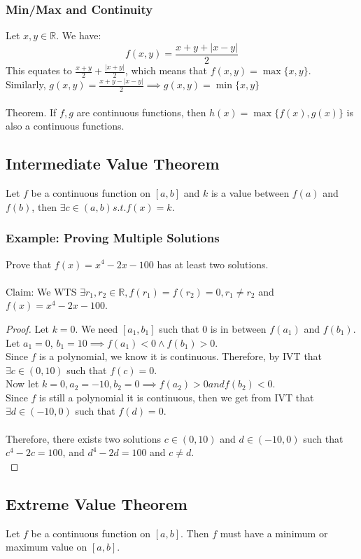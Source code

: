 \documentclass{article}
\begin{document}
\subsubsection{Min/Max and Continuity}
Let $x, y \in\mathbb{R}.$ We have:
$$f(x, y) = \frac{x+y + |x-y|}{2}$$
This equates to $\frac{x+y}{2} + \frac{|x+y|}{2}$, which means that $f(x,y) = \max\{x, y\}$.\\
Similarly, $g(x,y) = \frac{x + y - |x - y|}{2} \implies g(x,y) = \min\{x, y\}$\\
\\
Theorem. If $f,g$ are continuous functions, then $h(x) = \max\{f(x), g(x)\}$ is also a continuous functions.
\subsection{Intermediate Value Theorem}
Let $f$ be a continuous function on $[a, b]$ and $k$ is a value between $f(a)$ and $f(b)$, then $\exists c \in (a,b) s.t. f(x) = k$.
\subsubsection{Example: Proving Multiple Solutions}
Prove that $f(x) = x^4 - 2x - 100$ has at least two solutions.\\
\\
Claim: We WTS $\exists r_1, r_2 \in \mathbb{R}, f(r_1) = f(r_2) = 0, r_1 \neq r_2$ and $f(x) = x^4 - 2x - 100$.\\
\begin{proof}
Let $k = 0$. We need $[a_1, b_1] $ such that 0 is in between $f(a_1)$ and $f(b_1)$.\\
Let $a_1 = 0$, $b_1 = 10 \implies f(a_1) < 0 \land f(b_1) > 0$.\\
Since $f$ is a polynomial, we know it is continuous. Therefore, by IVT that $\exists c \in (0, 10)$ such that $f(c) = 0$.\\
Now let $k = 0, a_2 = -10, b_2 = 0 \implies f(a_2) > 0 and f(b_2) < 0$.\\
Since $f$ is still a polynomial it is continuous, then we get from IVT that $\exists d \in (-10, 0) $ such that $f(d) = 0$.\\
\\
Therefore, there exists two solutions $c \in (0, 10)$ and $d \in (-10, 0)$ such that $c^4 - 2c = 100$, and $d^4 - 2d = 100$ and $c \neq d$.\\
\end{proof}
\subsection{Extreme Value Theorem}
Let $f$ be a continuous function on $[a,b]$. Then $f$ must have a minimum or maximum value on $[a,b]$.
\newpage
\end{document}
